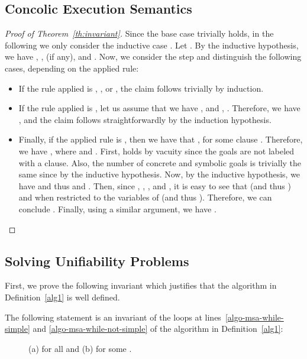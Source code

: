 \documentclass[fleqn]{tlp}
\begin{document}
\begin{appendix}
\subsection{Concolic Execution Semantics}

\begin{proof}[Proof of Theorem~\ref{th:invariant}]
  Since the base case  trivially holds, in the following we only
  consider the inductive case . Let . By the
  inductive hypothesis, we have , ,  (if
  any), and . Now, we
  consider the step  and distinguish the
  following cases, depending on the applied rule:
  \begin{itemize}
  \item If the rule applied is , ,
     or , the claim follows
    trivially by induction.

  \item If the rule applied is , let us assume that
    we have ,  and , . Therefore, we have , and the claim follows straightforwardly by the induction
    hypothesis.

  \item Finally, if the applied rule is , then we
    have that ,  for some clause . Therefore, we have , where
     and . First, 
    holds by vacuity since the goals are not labeled with a
    clause. Also, the number of concrete and symbolic goals is
    trivially the same since  by the inductive hypothesis.
    Now, by the inductive hypothesis, we have  and thus
     and . Then, since ,
    , , and , it is easy to see that
     (and thus )
    and  when restricted to the variables of  
    (and thus ). Therefore, we can conclude
    .
    Finally, using a similar argument, we have
    .
  \end{itemize}
\end{proof}

\subsection{Solving Unifiability Problems}

First, we prove the following invariant which justifies that the
algorithm in Definition~\ref{alg1} is well defined.

\begin{proposition}
  The following statement is an invariant of the loops at
  lines~\ref{algo-msa-while-simple} and
  \ref{algo-msa-while-not-simple} of the algorithm in
  Definition~\ref{alg1}:
  \begin{description}
  \item[] (a)  for all 
    and (b)  for some .
  \end{description}
\end{proposition}


\end{appendix}
\end{document}
